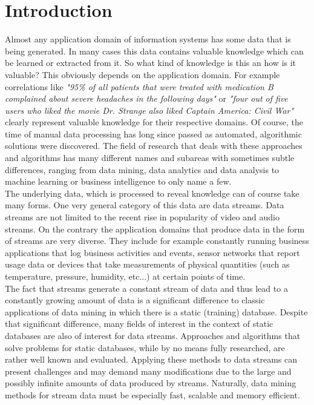 
\chapter{Introduction}  %

\ifpdf
    \graphicspath{{Chapter1/Figs/Raster/}{Chapter1/Figs/PDF/}{Chapter1/Figs/}}
\else
    \graphicspath{{Chapter1/Figs/Vector/}{Chapter1/Figs/}}
\fi

Almost any application domain of information systems has some data that is being generated. In many cases this data contains valuable knowledge which can be learned or extracted from it. So what kind of knowledge is this an how is it valuable? This obviously depends on the application domain. For example correlations like \textit{"95\% of all patients that were treated with medication B complained about severe headaches in the following days"} or \textit{"four out of five users who liked the movie Dr. Strange also liked Captain America: Civil War"} clearly represent valuable knowledge for their respective domains. Of course, the time of manual data processing has long since passed as automated, algorithmic solutions were discovered. The field of research that deals with these approaches and algorithms has many different names and subareas with sometimes subtle differences, ranging from data mining, data analytics and data analysis to machine learning or business intelligence to only name a few. \\
The underlying data, which is processed to reveal knowledge can of course take many forms. One very general category of this data are data streams. Data streams are not limited to the recent rise in popularity of video and audio streams. On the contrary the application domains that produce data in the form of streams are very diverse. They include for example constantly running business applications that log business activities and events, sensor networks that report usage data or devices that take measurements of physical quantities (such as temperature, pressure, humidity, etc...) at certain points of time. \\
The fact that streams generate a constant stream of data and thus lead to a constantly growing amount of data is a significant difference to classic applications of data mining in which there is a static (training) database. Despite that significant difference, many fields of interest in the context of static databases are also of interest for data streams. Approaches and algorithms that solve problems for static databases, while by no means fully researched, are rather well known and evaluated. Applying these methods to data streams can present challenges and may demand many modifications due to the large and possibly infinite amounts of data produced by streams. Naturally, data mining methods for stream data must be especially fast, scalable and memory efficient. \newline
